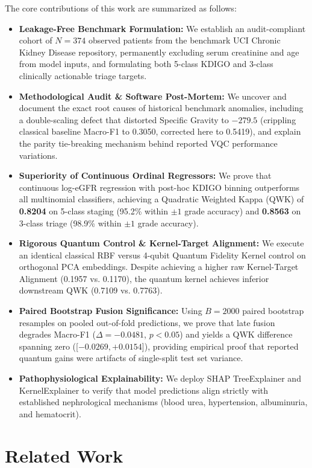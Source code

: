 \documentclass[conference]{IEEEtran}
\begin{document}
The core contributions of this work are summarized as follows:
\begin{itemize}
    \item \textbf{Leakage-Free Benchmark Formulation:} We establish an audit-compliant cohort of $N = 374$ observed patients from the benchmark UCI Chronic Kidney Disease repository, permanently excluding serum creatinine and age from model inputs, and formulating both 5-class KDIGO and 3-class clinically actionable triage targets.
    \item \textbf{Methodological Audit \& Software Post-Mortem:} We uncover and document the exact root causes of historical benchmark anomalies, including a double-scaling defect that distorted Specific Gravity to $-279.5$ (crippling classical baseline Macro-F1 to 0.3050, corrected here to 0.5419), and explain the parity tie-breaking mechanism behind reported VQC performance variations.
    \item \textbf{Superiority of Continuous Ordinal Regressors:} We prove that continuous log-eGFR regression with post-hoc KDIGO binning outperforms all multinomial classifiers, achieving a Quadratic Weighted Kappa (QWK) of \textbf{0.8204} on 5-class staging (95.2\% within $\pm 1$ grade accuracy) and \textbf{0.8563} on 3-class triage (98.9\% within $\pm 1$ grade accuracy).
    \item \textbf{Rigorous Quantum Control \& Kernel-Target Alignment:} We execute an identical classical RBF versus 4-qubit Quantum Fidelity Kernel control on orthogonal PCA embeddings. Despite achieving a higher raw Kernel-Target Alignment (0.1957 vs. 0.1170), the quantum kernel achieves inferior downstream QWK (0.7109 vs. 0.7763).
    \item \textbf{Paired Bootstrap Fusion Significance:} Using $B=2000$ paired bootstrap resamples on pooled out-of-fold predictions, we prove that late fusion degrades Macro-F1 ($\Delta = -0.0481$, $p < 0.05$) and yields a QWK difference spanning zero ([$-0.0269, +0.0154$]), providing empirical proof that reported quantum gains were artifacts of single-split test set variance.
    \item \textbf{Pathophysiological Explainability:} We deploy SHAP TreeExplainer and KernelExplainer to verify that model predictions align strictly with established nephrological mechanisms (blood urea, hypertension, albuminuria, and hematocrit).
\end{itemize}

\section{Related Work}
\end{document}
